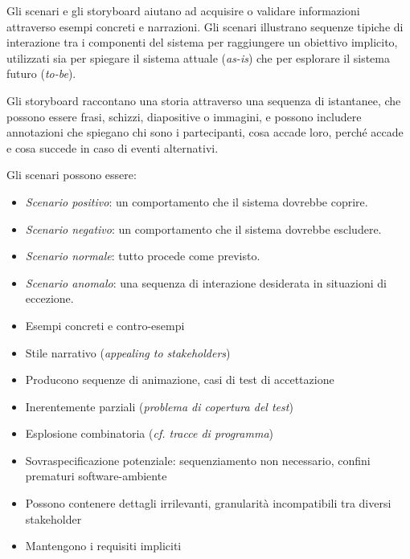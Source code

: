 Gli scenari e gli storyboard aiutano ad acquisire o validare informazioni
attraverso esempi concreti e narrazioni. Gli scenari illustrano sequenze
tipiche di interazione tra i componenti del sistema per raggiungere un
obiettivo implicito, utilizzati sia per spiegare il sistema attuale
(\textit{as-is}) che per esplorare il sistema futuro (\textit{to-be}).

Gli storyboard raccontano una storia attraverso una sequenza di istantanee,
che possono essere frasi, schizzi, diapositive o immagini, e possono includere
annotazioni che spiegano chi sono i partecipanti, cosa accade loro, perché
accade e cosa succede in caso di eventi alternativi.

Gli scenari possono essere:

\begin{itemize}
    \item \textit{Scenario positivo}: un comportamento che il sistema dovrebbe
    coprire.
    \item \textit{Scenario negativo}: un comportamento che il sistema dovrebbe
    escludere.
    \item \textit{Scenario normale}: tutto procede come previsto.
    \item \textit{Scenario anomalo}: una sequenza di interazione desiderata in
    situazioni di eccezione.
\end{itemize}

\begin{tcolorbox}[colback=green!5!white,colframe=green!75!black, title=Pro degli
    scenari e storyboard]
    \begin{itemize}
        \item Esempi concreti e contro-esempi
        \item Stile narrativo (\textit{appealing to stakeholders})
        \item Producono sequenze di animazione, casi di test di accettazione
    \end{itemize}
\end{tcolorbox}

\begin{tcolorbox}[colback=red!5!white,colframe=red!75!black, title=Contro degli
    scenari e storyboard]
    \begin{itemize}
        \item Inerentemente parziali (\textit{problema di copertura del test})
        \item Esplosione combinatoria (\textit{cf. tracce di programma})
        \item Sovraspecificazione potenziale: sequenziamento non necessario,
        confini prematuri software-ambiente
        \item Possono contenere dettagli irrilevanti, granularità incompatibili
        tra diversi stakeholder
        \item Mantengono i requisiti impliciti
    \end{itemize}
\end{tcolorbox}

